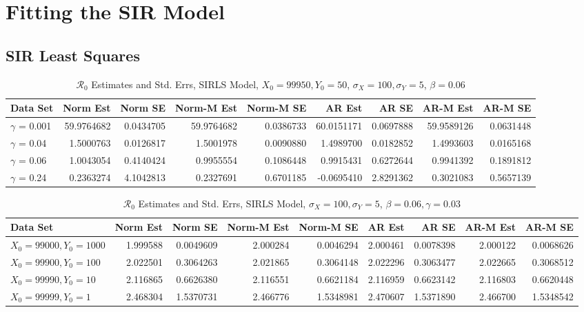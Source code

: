 \documentclass[12pt]{article}
\newcommand{\rr}{\ensuremath{\mathcal{R}_0}}
\begin{document}
\section{Fitting the SIR Model}

\subsection{SIR Least Squares}


\begin{table}[H]
	
	\caption{\label{tab:}$\rr$ Estimates and Std. Errs, SIRLS Model,
		$X_0 = 99950, Y_0 = 50$, $\sigma_X = 100, \sigma_Y = 5$, $\beta = 0.06$}
	\centering
	\begin{footnotesize}
		\begin{tabular}[t]{l|r|r|r|r|r|r|r|r}
			\hline
			Data Set & Norm Est & Norm SE & Norm-M Est & Norm-M SE & AR Est & AR SE & AR-M Est & AR-M SE\\
			\hline
			$\gamma$ = 0.001 & 59.9764682 & 0.0434705 & 59.9764682 & 0.0386733 & 60.0151171 & 0.0697888 & 59.9589126 & 0.0631448\\
			\hline
			$\gamma$ = 0.04 & 1.5000763 & 0.0126817 & 1.5001978 & 0.0090880 & 1.4989700 & 0.0182852 & 1.4993603 & 0.0165168\\
			\hline
			$\gamma$ = 0.06 & 1.0043054 & 0.4140424 & 0.9955554 & 0.1086448 & 0.9915431 & 0.6272644 & 0.9941392 & 0.1891812\\
			\hline
			$\gamma$ = 0.24 & 0.2363274 & 4.1042813 & 0.2327691 & 0.6701185 & -0.0695410 & 2.8291362 & 0.3021083 & 0.5657139\\
			\hline
		\end{tabular}
	\end{footnotesize}
\end{table}

\begin{table}[H]
	
	\caption{\label{tab:}$\rr$ Estimates and Std. Errs, SIRLS Model,
		$\sigma_X = 100, \sigma_Y = 5$, $\beta = 0.06, \gamma = 0.03$}
	\centering
	\begin{footnotesize}
		\begin{tabular}[t]{l|r|r|r|r|r|r|r|r}
			\hline
			Data Set & Norm Est & Norm SE & Norm-M Est & Norm-M SE & AR Est & AR SE & AR-M Est & AR-M SE\\
			\hline
			$X_0 = 99000, Y_0 = 1000$ & 1.999588 & 0.0049609 & 2.000284 & 0.0046294 & 2.000461 & 0.0078398 & 2.000122 & 0.0068626\\
			\hline
			$X_0 = 99900, Y_0 = 100$ & 2.022501 & 0.3064263 & 2.021865 & 0.3064148 & 2.022296 & 0.3063477 & 2.022665 & 0.3068512\\
			\hline
			$X_0 = 99990, Y_0 = 10$ & 2.116865 & 0.6626380 & 2.116551 & 0.6621184 & 2.116959 & 0.6623142 & 2.116803 & 0.6620448\\
			\hline
			$X_0 = 99999, Y_0 = 1$ & 2.468304 & 1.5370731 & 2.466776 & 1.5348981 & 2.470607 & 1.5371890 & 2.466700 & 1.5348542\\
			\hline
		\end{tabular}
	\end{footnotesize}
\end{table}
\end{document}
